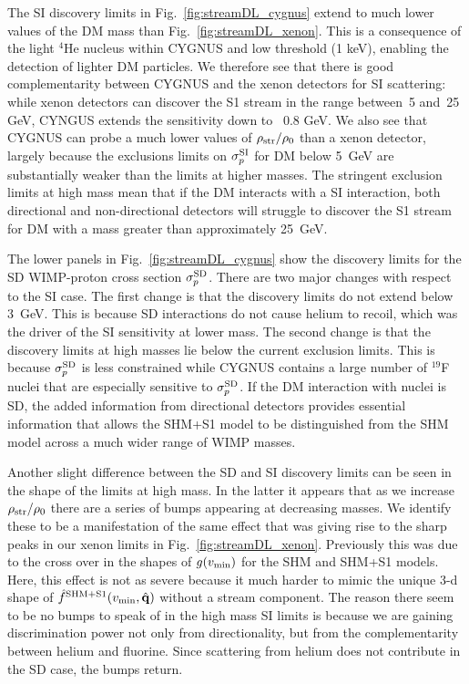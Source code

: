 \documentclass[prd,10pt,twocolumn,showpacs,nofootinbib,aps,superscriptaddress,preprintnumbers]{revtex4-1}
\newcommand{\qhat}{\hat{\mathbf{q}}}
\newcommand{\vmin}{v_{\rm min}}
\begin{document}
The SI discovery limits in Fig.~\ref{fig:streamDL_cygnus} extend to much lower values of the DM mass than Fig.~\ref{fig:streamDL_xenon}.
This is a consequence of the light $^4$He nucleus within CYGNUS and low threshold (1 keV),
enabling the detection of lighter DM particles. 
We therefore see that there is good complementarity between CYGNUS and the xenon
detectors for SI scattering: while xenon detectors can discover the S1 stream in the range 
between~5 and~25 GeV, CYNGUS extends the sensitivity down to ~0.8 GeV.
We also see that CYGNUS can probe a much lower values of $\rho_{\rm{str}}/\rho_0$ than a xenon detector,
largely because the exclusions limits on $\sigma^{\rm SI}_p$ for DM below 5~GeV are substantially weaker 
than the limits at higher masses. 
The stringent exclusion limits at high mass mean that if the DM interacts with a SI interaction,
both directional and non-directional detectors will struggle to discover the S1 stream
for DM with a mass greater than approximately 25~GeV.

The lower panels in Fig.~\ref{fig:streamDL_cygnus} show the discovery limits for the SD WIMP-proton cross section $\sigma^{\rm SD}_p$.
There are two major changes with respect to the SI case. The first change is that the discovery limits do not extend below 3~GeV.
This is because SD interactions do not cause helium to recoil, which was the driver of the SI sensitivity at lower mass.
The second change is that the discovery limits at high masses lie below the current exclusion limits.
This is because $\sigma^{\rm SD}_p$ is less constrained while CYGNUS contains a large number of $^{19}$F nuclei
that are especially sensitive to $\sigma^{\rm SD}_p$. 
If the DM interaction with nuclei is SD, the added information from directional detectors provides
essential information that allows the SHM+S1 model to be distinguished from the SHM model
across a much wider range of WIMP masses.

Another slight difference between the SD and SI discovery limits can be seen in the shape of the limits at high mass. 
In the latter it appears that as we increase $\rho_{\rm str}/\rho_0$ there are a series of bumps appearing at decreasing masses. 
We identify these to be a manifestation of the same effect that was giving rise to the sharp peaks in our xenon limits in Fig.~\ref{fig:streamDL_xenon}. 
Previously this was due to the cross over in the shapes of $g(\vmin)$ for the SHM and SHM+S1 models. 
Here, this effect is not as severe because it much harder to mimic the unique 3-d shape of $\hat{f}^{\rm SHM+S1}(\vmin,\qhat)$ without a stream component. 
The reason there seem to be no bumps to speak of in the high mass SI limits is because we are gaining discrimination power not only from directionality, 
but from the complementarity between helium and fluorine. Since scattering from helium does not contribute in the SD case, the bumps return. 
\end{document}
